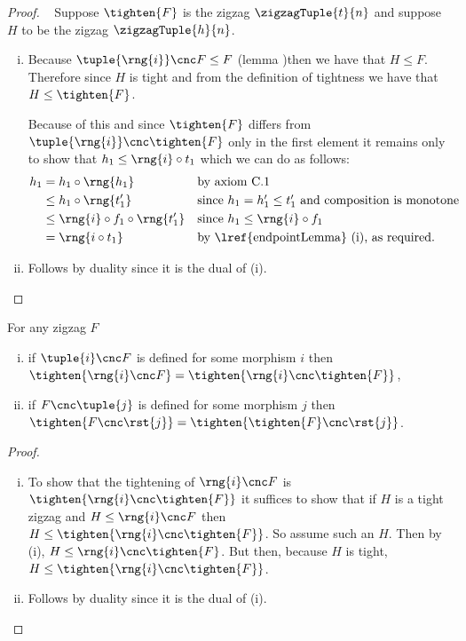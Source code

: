 \begin{proof}
~
Suppose $\tighten{F}$ is the zigzag $\zigzagTuple{t}{n}$
and suppose $H$ to be the zigzag $\zigzagTuple{h}{n}$.
\begin{enumerate}[(i)]
\item %
Because $\tuple{\rng{i}} \cnc F \leq F$ (lemma )then we have that
$H \leq F$. Therefore since $H$ is tight and from the definition
of tightness we have that
$H \leq \tighten{F}$.

Because of this and since $\tighten{F}$ differs from
$\tuple{\rng{i}} \cnc \tighten{F}$ only in the first element
it remains only to show that
$h_1 \leq \rng{i} \circ t_1$ which we can do as follows:
\begin{align*}
h_1 &=  h_1 \circ \rng{h_1} 
             && \mbox{by axiom C.1}\\
    &\leq h_1\circ \rng{t'_1} 
             && \mbox{since $h_1 = h'_1 \leq t'_1$ and composition is monotone} \\
    &\leq \rng{i} \circ f_1 \circ \rng{t'_1} 
             && \mbox{since $h_1 \leq \rng{i} \circ f_1$} \\
    &= \rng{i \circ t_1}
            && \mbox{by \lref{endpointLemma} (i), as required.} 
\end{align*}


\item %
Follows by duality since it is the dual of (i).
\end{enumerate}
\end{proof}
\begin{lemma}
For any zigzag $F$
\begin{enumerate}[(i)]
\item
if $\tuple{i} \cnc F$ is defined for some morphism $i$ then
$\tighten{\rng{i} \cnc F}
         = \tighten{\rng{i} \cnc \tighten{F}}$,
\item 
if $F \cnc \tuple{j}$ is defined for some morphism $j$ then
$\tighten{F \cnc \rst{j}}
         = \tighten{\tighten{F} \cnc \rst{j}}$.
\end{enumerate}
\end{lemma}
\begin{proof}
~
\begin{enumerate}[(i)]
\item %
To show that the tightening of $\rng{i} \cnc F$
is $\tighten{\rng{i}\cnc \tighten{F}}$ it suffices to show that if
$H$ is a tight zigzag and $H \leq \rng{i} \cnc F$ then
$H \leq \tighten{\rng{i}\cnc \tighten{F}}$. So assume such an $H$.
Then by  (i), $H \leq \rng{i} \cnc \tighten{F}$.
But then, because $H$ is tight,
$H \leq \tighten{\rng{i}\cnc \tighten{F}}$.
\item %
Follows by duality since it is the dual of (i).
\end{enumerate}
\end{proof}

